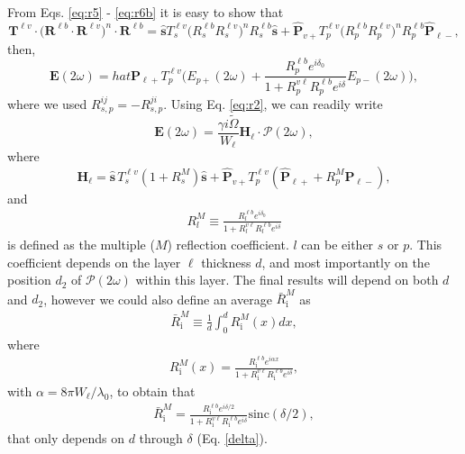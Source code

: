 From Eqs. \eqref{eq:r5} - \eqref{eq:r6b} it is easy to show that
\begin{equation*}\label{eq:m1}
\mathbf{T}^{\ell v}\cdot
\Big(\mathbf{R}^{\ell b}\cdot\mathbf{R}^{\ell v}\Big)^{n}\cdot
\mathbf{R}^{\ell b}
= \hat{\mathbf{s}}T^{\ell v}_{s}
  \Big(R^{\ell b}_{s}R^{\ell v}_{s}\Big)^{n}R^{\ell b}_{s}\hat{\mathbf{s}}
+ \hat{\mathbf{P}}_{v+}T^{\ell v}_{p}\Big(R^{\ell b}_{p}R^{\ell v}_{p}\Big)^n 
  R^{\ell b}_{p} 
\hat{\mathbf{P}}_{\ell-},
\end{equation*}
then,
\begin{equation}\label{eq:E2wreduced}
\mathbf{E}(2\omega) 
=  hat{\mathbf{P}}_{\ell +}T^{\ell v}_{p}
\Big(
E_{p+}(2\omega) +
\frac{R^{\ell b}_{p}e^{i\delta_{0}}}{1 + R^{v\ell}_{p}R^{\ell b}_{p}e^{i\delta}}
E_{p-}(2\omega) 
\Big),
\end{equation}
where we used $R^{ij}_{s,p}=-R^{ji}_{s,p}$. Using Eq. \eqref{eq:r2}, we can
readily write
\begin{equation}\label{eq:mr8}
\mathbf{E}(2\omega) =
\frac{\gamma i\tilde{\Omega}}{W_{\ell}}\mathbf{H}_{\ell}\cdot
\boldsymbol{\mathcal{P}}(2\omega),
\end{equation}
where
\begin{equation}\label{eq:mr9}
\mathbf{H}_{\ell}
= \hat{\mathbf{s}}\,T_{s}^{\ell v}
\left(1+ R^{M}_{s}\right)\hat{\mathbf{s}} + \hat{\mathbf{P}}_{v+}T_{p}^{\ell v}
\left(\hat{\mathbf{P}}_{\ell +} + R^{M}_{p}\hat{\mathbf{P}}_{\ell -}\right),
\end{equation}
and
\begin{align}\label{m61}
R^{M}_{l}\equiv
\frac{R^{\ell b}_{l}e^{i\delta_{0}}}
     {1+R^{v\ell}_{l} R^{\ell b}_{l}e^{i\delta}}
\end{align}
is defined as the multiple ($M$) reflection coefficient. $l$ can be either $s$
or $p$. This coefficient depends on the layer $\ell$ thickness $d$, and most
importantly on the position $d_{2}$ of $\boldsymbol{\mathcal P}(2\omega)$ within
this layer. The final results will depend on both $d$ and $d_{2}$, however we
could also define an average $\bar{R}^{M}_\mathrm{i}$ as
\begin{align}\label{eq:mcave}
\bar{R}^{M}_\mathrm{i}\equiv \frac{1}{d}\int_0^d R^{M}_\mathrm{i}(x)dx  
,
\end{align} 
where 
\begin{align}\label{eq:m16}
R^{M}_{\mathrm{i}} (x)
= 
\frac{R^{\ell b}_{\mathrm{i}}e^{i\alpha x}}
{1 + R^{v\ell}_{\mathrm{i}}R^{\ell b}_{\mathrm{i}}e^{i\delta}}
,
\end{align}
with $\alpha=8\pi W_{\ell}/\lambda_{0}$, to obtain that
\begin{align}\label{eq:mcave2}
\bar{R}^{M}_\mathrm{i}
= 
\frac{R^{\ell b}_{\mathrm{i}}e^{i\delta/2}}
{1 + R^{v\ell}_{\mathrm{i}}R^{\ell b}_{\mathrm{i}}e^{i\delta}}
\mathrm{sinc}(\delta/2) 
,
\end{align}
that only depends on $d$ through $\delta$ (Eq. \eqref{delta}).

